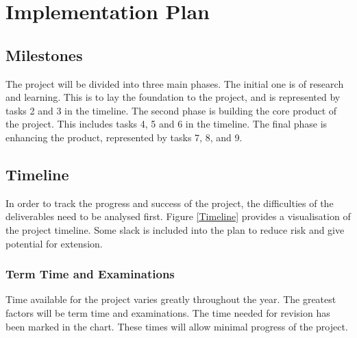 \section{Implementation Plan}


\subsection{Milestones}
The project will be divided into three main phases.
The initial one is of research and learning.
This is to lay the foundation to the project, and is represented by tasks 2 and
3 in the timeline.
The second phase is building the core product of the project.
This includes tasks 4, 5 and 6 in the timeline.
The final phase is enhancing the product, represented by tasks 7, 8, and 9.

\subsection{Timeline}
\begin{figure*}
  \centering
  
  \caption{Project Timeline}
  \label{Timeline}
\end{figure*}

In order to track the progress and success of the project, the difficulties
of the deliverables need to be analysed first.
Figure \ref{Timeline} provides a visualisation of the project timeline.
Some slack is included into the plan to reduce risk and give potential for
extension.


\subsubsection{\textbf{Term Time and Examinations}}
Time available for the project varies greatly throughout the year.
The greatest factors will be term time and examinations.
The time needed for revision has been marked in the chart.
These times will allow minimal progress of the project.

